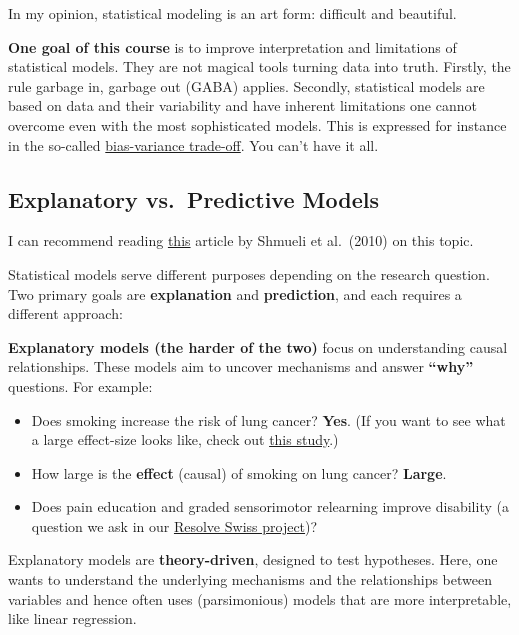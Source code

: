 \documentclass[
]{book}
\providecommand{\tightlist}{%
  \setlength{\itemsep}{0pt}\setlength{\parskip}{0pt}}
\begin{document}
In my opinion, statistical modeling is an art form: difficult and beautiful.

\textbf{One goal of this course} is to improve interpretation and limitations of statistical models.
They are not magical tools turning data into truth. Firstly, the rule garbage in, garbage out (GABA) applies.
Secondly, statistical models are based on data and their variability and have inherent limitations
one cannot overcome even with the most sophisticated models. This is expressed for instance
in the so-called \href{https://en.wikipedia.org/wiki/Bias\%E2\%80\%93variance_tradeoff}{bias-variance trade-off}.
You can't have it all.

\subsection{Explanatory vs.~Predictive Models}\label{explanatory-vs.-predictive-models}

I can recommend reading \href{https://projecteuclid.org/journals/statistical-science/volume-25/issue-3/To-Explain-or-to-Predict/10.1214/10-STS330.full}{this}
article by Shmueli et al.~(2010) on this topic.

Statistical models serve different purposes depending on the research question. Two primary goals are \textbf{explanation}
and \textbf{prediction}, and each requires a different approach:

\textbf{Explanatory models (the harder of the two)} focus on understanding causal
relationships.
These models aim to uncover mechanisms and answer \textbf{``why''}
questions. For example:

\begin{itemize}
\tightlist
\item
  Does smoking increase the risk of lung cancer? \textbf{Yes}. (If you want to see what a large effect-size looks like, check out \href{https://bmjopen.bmj.com/content/bmjopen/8/10/e021611.full.pdf}{this study}.)
\item
  How large is the \textbf{effect} (causal) of smoking on lung cancer? \textbf{Large}.
\item
  Does pain education and graded sensorimotor relearning improve disability (a question we ask in
  our \href{https://data.snf.ch/grants/grant/220585}{Resolve Swiss project})?
\end{itemize}

Explanatory models are \textbf{theory-driven}, designed to test hypotheses. Here, one wants to understand the underlying
mechanisms and the relationships between variables and hence often uses (parsimonious) models that are more interpretable,
like linear regression.
\end{document}
